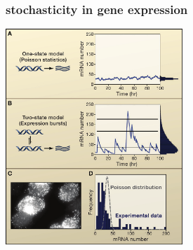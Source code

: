 \begin{frame}
\vspace{1em}
\frametitle{stochasticity in gene expression}
\begin{center}
\includegraphics[width=0.5\textwidth]{fig/rajvOf3thresh.pdf}\\
\hfill \cite{Raj2008a}
\end{center}
\end{frame}
